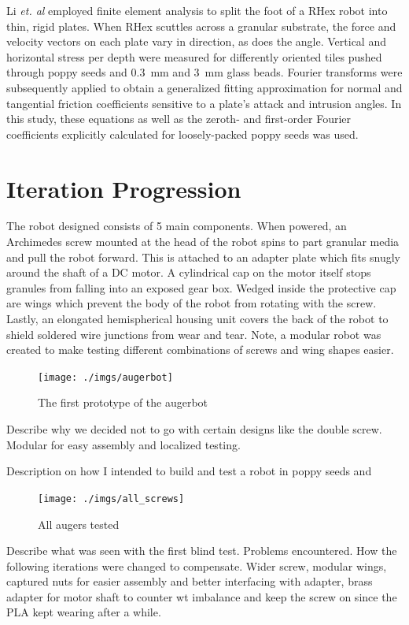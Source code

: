 \documentclass[letterpaper, 11 pt]{article}
\begin{document}
Li \textit{et. al} employed finite element analysis to split the foot of a RHex robot into thin, rigid plates. When RHex scuttles across a granular substrate, the force and velocity vectors on each plate vary in direction, as does the angle. 
Vertical and horizontal stress per depth were measured for differently oriented tiles pushed through poppy seeds and \SI{0.3}{\milli\m} and \SI{3}{\milli\m} glass beads. 
Fourier transforms were subsequently applied to obtain a generalized fitting approximation for normal and tangential friction coefficients sensitive to a plate's attack and intrusion angles. In this study, these equations as well as the zeroth- and first-order Fourier coefficients explicitly calculated for loosely-packed poppy seeds was used. 

\section{Iteration Progression}

The robot designed consists of 5 main components. When powered, an Archimedes screw mounted at the head of the robot spins to part granular media and pull the robot forward. This is attached to an adapter plate which fits snugly around the shaft of a DC motor. A cylindrical cap on the motor itself stops granules from falling into an exposed gear box. Wedged inside the protective cap are wings which prevent the body of the robot from rotating with the screw. Lastly, an elongated hemispherical housing unit covers the back of the robot to shield soldered wire junctions from wear and tear. Note, a modular robot was created to make testing different combinations of screws and wing shapes easier.

\begin{figure}[H]
\centering
\texttt{[image: ./imgs/augerbot]}
\caption{The first prototype of the augerbot}
\label{fig:augerbot}
\end{figure}

Describe why we decided not to go with certain designs like the double screw. Modular for easy assembly and localized testing.

Description on how I intended to build and test a robot in poppy seeds and 


\begin{figure}[H]
\centering
\texttt{[image: ./imgs/all\_screws]}
\caption{All augers tested}
\label{fig:all_screws}
\end{figure}

Describe what was seen with the first blind test. Problems encountered. 
How the following iterations were changed to compensate. 
Wider screw, modular wings, captured nuts for easier assembly and better interfacing with adapter, brass adapter for motor shaft to counter wt imbalance and keep the screw on since the PLA kept wearing after a while.
\end{document}
